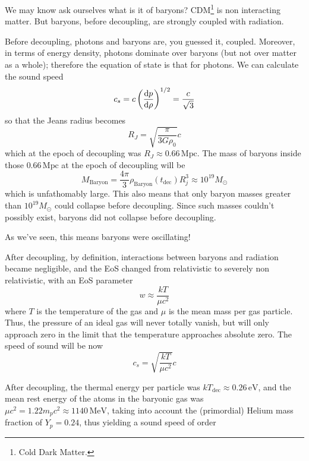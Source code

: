 \par We may know ask ourselves what is it of baryons? CDM\footnote{Cold Dark Matter.} is non interacting matter. But baryons, before decoupling, are strongly coupled with radiation.
\par Before decoupling, photons and baryons are, you guessed it, coupled. Moreover, in terms of energy density, photons dominate over baryons (but not over matter as a whole); therefore the equation of state is that for photons. We can calculate the sound speed
\begin{equation*}
    c_{s} = c\left(\frac{\text{d}p}{\text{d}\rho}\right)^{1/2} = \frac{c}{\sqrt{3}}
\end{equation*}
so that the Jeans radius becomes
\begin{equation*}
    R_{J} = \sqrt{\frac{\pi}{3G\rho_{0}}}c
\end{equation*}
which at the epoch of decoupling was $R_{J}\approx 0.66\,\text{Mpc}$. The mass of baryons inside those $0.66\,\text{Mpc}$ at the epoch of decoupling will be 
\begin{equation*}
    M_{\text{Baryon}} = \frac{4\pi}{3}\rho_{\text{Baryon}}(t_{\text{dec}})R_{j}^{3}\approx 10^{19}M_{\odot}
\end{equation*}
which is unfathomably large. This also means that only baryon masses greater than $10^{19}M_{\odot}$ could collapse before decoupling. Since such masses couldn't possibly exist, baryons did not collapse before decoupling.
\par As we've seen, this means baryons were oscillating!
\par After decoupling, by definition, interactions between baryons and radiation became negligible, and the EoS changed from relativistic to severely non relativistic, with an EoS parameter
\begin{equation*}
    w \approx \frac{kT}{\mu c^{2}}
\end{equation*}
where $T$ is the temperature of the gas and $\mu$ is the mean mass per gas particle. Thus, the pressure of an ideal gas will never totally vanish, but will only approach zero in the limit that the temperature approaches absolute zero. The speed of sound will be now
\begin{equation*}
    c_{s} = \sqrt{\frac{kT}{\mu c^{2}}}c
\end{equation*}
\par After decoupling, the thermal energy per particle was $kT_{\text{dec}} \approx 0.26\,\text{eV}$, and the mean rest energy of the atoms in the baryonic gas was $\mu c^{2} = 1.22 m_{p}c^{2} \approx 1140\,\text{MeV}$, taking into account the (primordial) Helium mass fraction of $Y_{p} = 0.24$, thus yielding a sound speed of order
